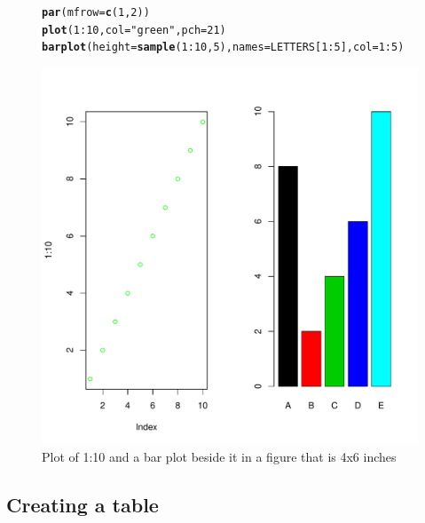 \documentclass{article}\usepackage[]{graphicx}\usepackage[]{color}
\makeatletter
\def\maxwidth{ %
  \ifdim\Gin@nat@width>\linewidth
    \linewidth
  \else
    \Gin@nat@width
  \fi
}
\newcommand{\hlnum}[1]{\textcolor[rgb]{0.686,0.059,0.569}{#1}}%
\newcommand{\hlstr}[1]{\textcolor[rgb]{0.192,0.494,0.8}{#1}}%
\newcommand{\hlopt}[1]{\textcolor[rgb]{0,0,0}{#1}}%
\newcommand{\hlstd}[1]{\textcolor[rgb]{0.345,0.345,0.345}{#1}}%
\newcommand{\hlkwc}[1]{\textcolor[rgb]{0.333,0.667,0.333}{#1}}%
\newcommand{\hlkwd}[1]{\textcolor[rgb]{0.737,0.353,0.396}{\textbf{#1}}}%
\newenvironment{kframe}{%
 \def\at@end@of@kframe{}%
 \ifinner\ifhmode%
  \def\at@end@of@kframe{\end{minipage}}%
  \begin{minipage}{\columnwidth}%
 \fi\fi%
 \def\FrameCommand##1{\hskip\@totalleftmargin \hskip-\fboxsep
 \colorbox{shadecolor}{##1}\hskip-\fboxsep
     \hskip-\linewidth \hskip-\@totalleftmargin \hskip\columnwidth}%
 \MakeFramed {\advance\hsize-\width
   \@totalleftmargin\z@ \linewidth\hsize
   \@setminipage}}%
 {\par\unskip\endMakeFramed%
 \at@end@of@kframe}
\newenvironment{knitrout}{}{} %
\makeatother
\begin{document}
\begin{figure}
\begin{knitrout}
\color{fgcolor}\begin{kframe}
\begin{alltt}
\hlkwd{par}\hlstd{(}\hlkwc{mfrow}\hlstd{=}\hlkwd{c}\hlstd{(}\hlnum{1}\hlstd{,}\hlnum{2}\hlstd{))}
\hlkwd{plot}\hlstd{(}\hlnum{1}\hlopt{:}\hlnum{10}\hlstd{,} \hlkwc{col}\hlstd{=}\hlstr{"green"}\hlstd{,} \hlkwc{pch}\hlstd{=}\hlnum{21}\hlstd{)}
\hlkwd{barplot}\hlstd{(}\hlkwc{height}\hlstd{=}\hlkwd{sample}\hlstd{(}\hlnum{1}\hlopt{:}\hlnum{10}\hlstd{,}\hlnum{5}\hlstd{),} \hlkwc{names}\hlstd{=LETTERS[}\hlnum{1}\hlopt{:}\hlnum{5}\hlstd{],} \hlkwc{col}\hlstd{=}\hlnum{1}\hlopt{:}\hlnum{5}\hlstd{)}
\end{alltt}
\end{kframe}
\includegraphics[width=\maxwidth]{figure/test3-1} 

\end{knitrout}

\caption{Plot of 1:10 and a bar plot beside it in a figure that is 4x6 inches}

\end{figure}

\newpage
\subsection{Creating a table}
\end{document}
